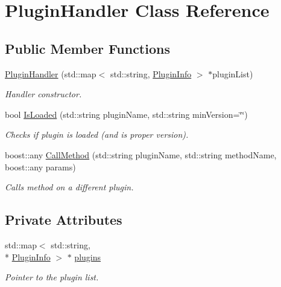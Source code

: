 \hypertarget{classPluginHandler}{\section{Plugin\-Handler Class Reference}
\label{classPluginHandler}
}
\subsection*{Public Member Functions}
\begin{DoxyCompactItemize}
\item 
\hyperlink{classPluginHandler_a3c6d5584880752aed8f9179c43f43a1a}{Plugin\-Handler} (std\-::map$<$ std\-::string, \hyperlink{structPluginInfo}{Plugin\-Info} $>$ $\ast$plugin\-List)
\begin{DoxyCompactList}\small\item\em Handler constructor. \end{DoxyCompactList}\item 
bool \hyperlink{classPluginHandler_a594d629d4905880d708ee265b9e48396}{Is\-Loaded} (std\-::string plugin\-Name, std\-::string min\-Version=\char`\"{}\char`\"{})
\begin{DoxyCompactList}\small\item\em Checks if plugin is loaded (and is proper version). \end{DoxyCompactList}\item 
boost\-::any \hyperlink{classPluginHandler_a7649e38de7dac286adcdf4658e93bf8d}{Call\-Method} (std\-::string plugin\-Name, std\-::string method\-Name, boost\-::any params)
\begin{DoxyCompactList}\small\item\em Calls method on a different plugin. \end{DoxyCompactList}\end{DoxyCompactItemize}
\subsection*{Private Attributes}
\begin{DoxyCompactItemize}
\item 
\hypertarget{classPluginHandler_a9eab5a7ae8084d335a06ea5826746899}{std\-::map$<$ std\-::string, \\*
\hyperlink{structPluginInfo}{Plugin\-Info} $>$ $\ast$ \hyperlink{classPluginHandler_a9eab5a7ae8084d335a06ea5826746899}{plugins}}\label{classPluginHandler_a9eab5a7ae8084d335a06ea5826746899}

\begin{DoxyCompactList}\small\item\em Pointer to the plugin list. \end{DoxyCompactList}\end{DoxyCompactItemize}


